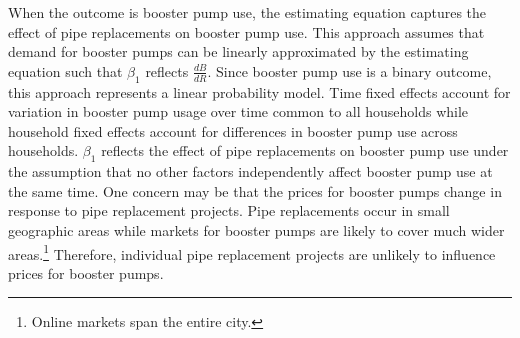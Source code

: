 \documentclass[12pt,table]{article}
\begin{document}
When the outcome is booster pump use, the estimating equation captures the effect of pipe replacements on booster pump use.  This approach assumes that demand for booster pumps can be linearly approximated by the estimating equation such that $\beta_1$ reflects $\frac{dB}{dR}$.  Since booster pump use is a binary outcome, this approach represents a linear probability model.  Time fixed effects account for variation in booster pump usage over time common to all households while household fixed effects account for differences in booster pump use across households.  $\beta_1$ reflects the effect of pipe replacements on booster pump use under the assumption that no other factors independently affect booster pump use at the same time.  One concern may be that the prices for booster pumps change in response to pipe replacement projects.  Pipe replacements occur in small geographic areas while markets for booster pumps are likely to cover much wider areas.\footnote{Online markets span the entire city.}  Therefore, individual pipe replacement projects are unlikely to influence prices for booster pumps.

\end{document}
